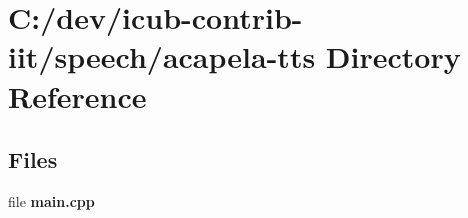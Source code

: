 \section{C\+:/dev/icub-\/contrib-\/iit/speech/acapela-\/tts Directory Reference}
\label{dir_e8ad49e6cfe0ef7523b04b6417656de2}
\subsection*{Files}
\begin{DoxyCompactItemize}
\item 
file {\bfseries main.\+cpp}
\end{DoxyCompactItemize}
